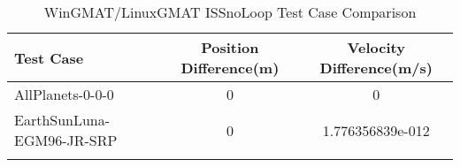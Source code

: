 \begin{table}[htbp!]
\centering
\caption{ WinGMAT/LinuxGMAT ISSnoLoop Test Case Comparison}
      \begin{tabular}{lcc}
      \hline\hline
          Test Case & Position Difference(m) & Velocity Difference(m/s) \\
         \hline
         AllPlanets-0-0-0 & 0 & 0 \\
         EarthSunLuna-EGM96-JR-SRP & 0 & 1.776356839e-012 \\
      \hline\hline
      \label{Table: ISSnoLoop WinGMAT-LinuxGMAT Table} 
\end{tabular}
\end{table}
